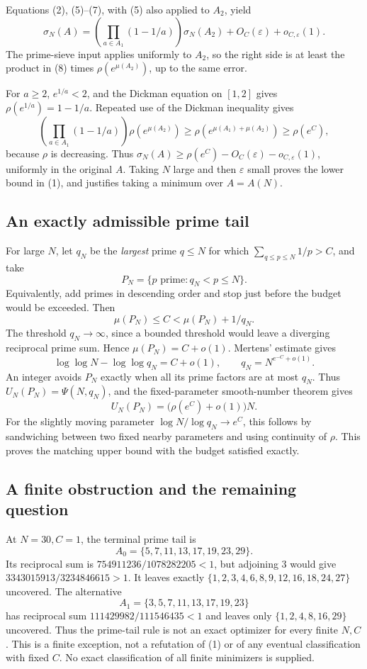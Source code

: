 Equations (2), (5)--(7), with (5) also applied to \(A_2\), yield
\[
\sigma_N(A)
=\left(\prod_{a\in A_1}(1-1/a)\right)\sigma_N(A_2)
 +O_C(\varepsilon)+o_{C,\varepsilon}(1). \tag{8}
\]
The prime-sieve input applies uniformly to \(A_2\), so the right side is at least the product in (8) times \(\rho(e^{\mu(A_2)})\), up to the same error.

For \(a\geq2\), \(e^{1/a}<2\), and the Dickman equation on \([1,2]\) gives \(\rho(e^{1/a})=1-1/a\). Repeated use of the Dickman inequality gives
\[
\left(\prod_{a\in A_1}(1-1/a)\right)\rho(e^{\mu(A_2)})
\geq\rho(e^{\mu(A_1)+\mu(A_2)})
\geq\rho(e^C),
\]
because \(\rho\) is decreasing. Thus \(\sigma_N(A)\geq\rho(e^C)-O_C(\varepsilon)-o_{C,\varepsilon}(1)\), uniformly in the original \(A\). Taking \(N\) large and then \(\varepsilon\) small proves the lower bound in (1), and justifies taking a minimum over \(A=A(N)\).

\subsection*{An exactly admissible prime tail}
For large \(N\), let \(q_N\) be the \emph{largest} prime \(q\leq N\) for which
\(\sum_{q\leq p\leq N}1/p>C\), and take
\[
P_N=\{p\text{ prime}:q_N<p\leq N\}.
\]
Equivalently, add primes in descending order and stop just before the budget would be exceeded. Then
\[
\mu(P_N)\leq C<\mu(P_N)+1/q_N.
\]
The threshold \(q_N\to\infty\), since a bounded threshold would leave a diverging reciprocal prime sum. Hence \(\mu(P_N)=C+o(1)\). Mertens' estimate gives
\[
\log\log N-\log\log q_N=C+o(1),\qquad
q_N=N^{e^{-C}+o(1)}.
\]
An integer avoids \(P_N\) exactly when all its prime factors are at most \(q_N\). Thus \(U_N(P_N)=\Psi(N,q_N)\), and the fixed-parameter smooth-number theorem gives
\[
U_N(P_N)=\bigl(\rho(e^C)+o(1)\bigr)N.
\]
For the slightly moving parameter \(\log N/\log q_N\to e^C\), this follows by sandwiching between two fixed nearby parameters and using continuity of \(\rho\). This proves the matching upper bound with the budget satisfied exactly.

\subsection*{A finite obstruction and the remaining question}
At \(N=30,C=1\), the terminal prime tail is
\[
A_0=\{5,7,11,13,17,19,23,29\}.
\]
Its reciprocal sum is \(754911236/1078282205<1\), but adjoining 3 would give \(3343015913/3234846615>1\). It leaves exactly
\(\{1,2,3,4,6,8,9,12,16,18,24,27\}\) uncovered.
The alternative
\[
A_1=\{3,5,7,11,13,17,19,23\}
\]
has reciprocal sum \(111429982/111546435<1\) and leaves only
\(\{1,2,4,8,16,29\}\) uncovered. Thus the prime-tail rule is not an exact optimizer for every finite \(N,C\). This is a finite exception, not a refutation of (1) or of any eventual classification with fixed \(C\). No exact classification of all finite minimizers is supplied.

